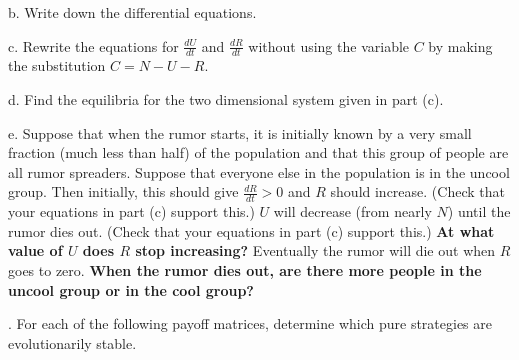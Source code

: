 \documentclass[reqno,12pt]{amsart}
\begin{document}
\bigskip
\noindent
b.  Write down the differential equations.

\bigskip
\noindent
c.  Rewrite the equations for $\frac{dU}{dt}$ and $\frac{dR}{dt}$
without using the variable $C$ by making the substitution $C=N-U-R$.

\bigskip
\noindent
d.  Find the equilibria for the two dimensional system given in part (c).

\bigskip
\noindent
e.  Suppose that when the rumor starts, it is initially known by a
very small fraction (much less than half) of the population and that
this group of people are all rumor spreaders.  Suppose that everyone
else in the population is in the uncool group.  Then initially, this
should give $\frac{dR}{dt}>0$ and $R$ should increase.  (Check that
your equations in part (c) support this.)  $U$ will decrease (from
nearly $N$) until the rumor dies out.  (Check that your equations in
part (c) support this.)  {\bf At what value of $U$ does $R$ stop
increasing?} Eventually the rumor will die out when $R$ goes to zero.
{\bf When the rumor dies out, are there more people in the uncool
group or in the cool group?}


\newpage

.  For each of the following payoff matrices, determine which pure
strategies are evolutionarily stable.
\end{document}
